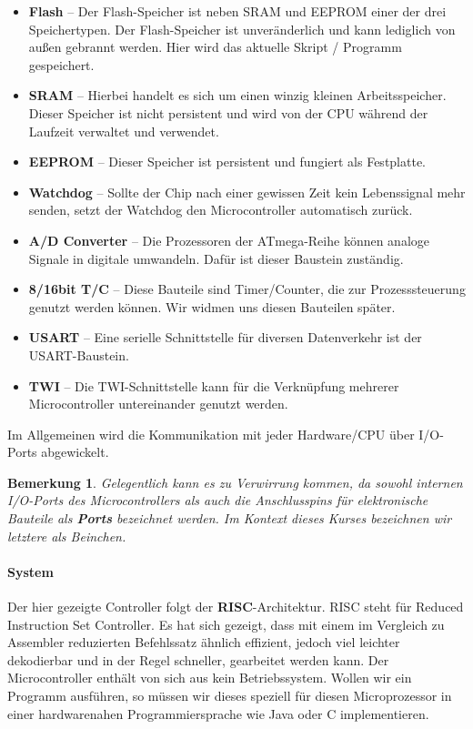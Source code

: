 \documentclass[11pt,a4paper]{scrartcl}
\newtheorem{note}{Bemerkung}
\begin{document}
\begin{itemize}
\item \textbf{Flash} -- Der Flash-Speicher ist neben SRAM und EEPROM einer der drei Speichertypen. Der Flash-Speicher ist unveränderlich und kann lediglich von außen gebrannt werden. Hier wird das aktuelle Skript / Programm gespeichert.
\item \textbf{SRAM} -- Hierbei handelt es sich um einen winzig kleinen Arbeitsspeicher. Dieser Speicher ist nicht persistent und wird von der CPU während der Laufzeit verwaltet und verwendet.
\item \textbf{EEPROM} -- Dieser Speicher ist persistent und fungiert als {\glqq}Festplatte{\grqq}.
\item \textbf{Watchdog} -- Sollte der Chip nach einer gewissen Zeit kein Lebenssignal mehr senden, setzt der Watchdog den Microcontroller automatisch zurück.
\item \textbf{A/D Converter} -- Die Prozessoren der ATmega-Reihe können analoge Signale in digitale umwandeln. Dafür ist dieser Baustein zuständig.
\item \textbf{8/16bit T/C} -- Diese Bauteile sind Timer/Counter, die zur Prozesssteuerung genutzt werden können. Wir widmen uns diesen Bauteilen später.
\item \textbf{USART} -- Eine serielle Schnittstelle für diversen Datenverkehr ist der USART-Baustein.
\item \textbf{TWI} -- Die TWI-Schnittstelle kann für die Verknüpfung mehrerer Microcontroller untereinander genutzt werden.
\end{itemize}
Im Allgemeinen wird die Kommunikation mit jeder Hardware/CPU über I/O-Ports abgewickelt. 
\begin{note}
Gelegentlich kann es zu Verwirrung kommen, da sowohl internen I/O-Ports des Microcontrollers als auch die Anschlusspins für elektronische Bauteile als \textbf{Ports} bezeichnet werden. Im Kontext dieses Kurses bezeichnen wir letztere als {\glqq}Beinchen{\grqq}.
\end{note}
\paragraph{System} Der hier gezeigte Controller folgt der \textbf{RISC}-Architektur. RISC steht für {\glqq}Reduced Instruction Set Controller{\grqq}. Es hat sich gezeigt, dass mit einem im Vergleich zu Assembler reduzierten Befehlssatz ähnlich effizient, jedoch viel leichter dekodierbar und in der Regel schneller, gearbeitet werden kann. Der Microcontroller enthält von sich aus kein Betriebssystem. Wollen wir ein Programm ausführen, so müssen wir dieses speziell für diesen Microprozessor in einer hardwarenahen Programmiersprache wie Java oder C implementieren.
\end{document}
